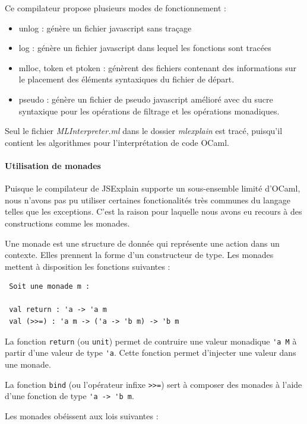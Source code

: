\documentclass{easychair}
\begin{document}
Ce compilateur propose plusieurs modes de fonctionnement :

\begin{itemize}
 \item unlog : génère un fichier javascript sans traçage
 \item log : génère un fichier javascript dans lequel les fonctions sont tracées
 \item mlloc, token et ptoken : génèrent des fichiers contenant des informations
sur le placement des éléments syntaxiques du fichier de départ.
 \item pseudo : génère un fichier de pseudo javascript amélioré avec du sucre 
syntaxique pour les opérations de filtrage et les opérations monadiques.
\end{itemize}

Seul le fichier \emph{MLInterpreter.ml} dans le dossier \emph{mlexplain} est 
tracé, puisqu'il contient les algorithmes pour l'interprétation de code OCaml.

\paragraph{Utilisation de monades}
Puisque le compilateur de JSExplain supporte un sous-ensemble limité d'OCaml, 
nous n'avons pas pu utiliser certaines fonctionalités très communes du langage 
telles que les exceptions. C'est la raison pour laquelle nous avons eu recours 
à des constructions comme les monades.

Une monade est une structure de donnée qui représente une action dans un 
contexte. Elles prennent la forme d'un constructeur de type. Les monades 
mettent à disposition les fonctions suivantes :

\begin{verbatim}
 Soit une monade m :
 
 val return : 'a -> 'a m
 val (>>=) : 'a m -> ('a -> 'b m) -> 'b m
\end{verbatim}

La fonction \verb|return| (ou \verb|unit|) permet de contruire une valeur 
monadique \verb|'a M| à partir d'une valeur de type \verb|'a|. Cette fonction 
permet d'injecter une valeur dans une monade.

La fonction \verb|bind| (ou l'opérateur infixe \verb|>>=|) sert à composer des 
monades à l'aide d'une fonction de type \verb|'a -> 'b m|.


Les monades obéissent aux lois suivantes :
\end{document}
